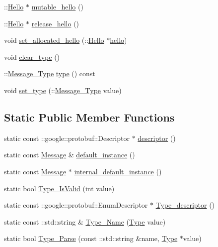 \begin{DoxyCompactItemize}
\item 
\+::\hyperlink{class_hello}{Hello} $\ast$ \hyperlink{class_message_ab74acd4d120a7c3cbdc26a8d61eeec55}{mutable\+\_\+hello} ()
\item 
\+::\hyperlink{class_hello}{Hello} $\ast$ \hyperlink{class_message_ad97dbbb06f566bca0343d401924b80f7}{release\+\_\+hello} ()
\item 
void \hyperlink{class_message_a02b81f83621d5e66bc77e37a2ca954eb}{set\+\_\+allocated\+\_\+hello} (\+::\hyperlink{class_hello}{Hello} $\ast$\hyperlink{class_message_a898179de741961b94361a2afa251dea0}{hello})
\item 
void \hyperlink{class_message_a6624e1a34cb787f818475d4b8b091d2d}{clear\+\_\+type} ()
\item 
\+::\hyperlink{message_8pb_8h_a1b620cd54f3d6b48f3c5f7979545b160}{Message\+\_\+\+Type} \hyperlink{class_message_a280acf280b0ebac63aa444c2db9431ea}{type} () const 
\item 
void \hyperlink{class_message_a8118c1b12f068dacbf3535c9879b2a25}{set\+\_\+type} (\+::\hyperlink{message_8pb_8h_a1b620cd54f3d6b48f3c5f7979545b160}{Message\+\_\+\+Type} value)
\end{DoxyCompactItemize}
\subsection*{Static Public Member Functions}
\begin{DoxyCompactItemize}
\item 
static const \+::google\+::protobuf\+::\+Descriptor $\ast$ \hyperlink{class_message_abdecae930e09b6ea3f22621b5d605821}{descriptor} ()
\item 
static const \hyperlink{class_message}{Message} \& \hyperlink{class_message_a698452c44213e0e57cf047fee56418ae}{default\+\_\+instance} ()
\item 
static const \hyperlink{class_message}{Message} $\ast$ \hyperlink{class_message_a0ab98269ed7906e7542c0d7fcdb25c6e}{internal\+\_\+default\+\_\+instance} ()
\item 
static bool \hyperlink{class_message_ac709f95123530e0aef536023d5f547ff}{Type\+\_\+\+Is\+Valid} (int value)
\item 
static const \+::google\+::protobuf\+::\+Enum\+Descriptor $\ast$ \hyperlink{class_message_afe208248065ee12c0bbffe71b54ed9ee}{Type\+\_\+descriptor} ()
\item 
static const \+::std\+::string \& \hyperlink{class_message_acf7fb4b05f015126dcf9f534e7281712}{Type\+\_\+\+Name} (\hyperlink{message_8pb_8h_a1b620cd54f3d6b48f3c5f7979545b160}{Type} value)
\item 
static bool \hyperlink{class_message_af70480ec0754cee5dc6c72144a0f1bb1}{Type\+\_\+\+Parse} (const \+::std\+::string \&name, \hyperlink{message_8pb_8h_a1b620cd54f3d6b48f3c5f7979545b160}{Type} $\ast$value)
\end{DoxyCompactItemize}
